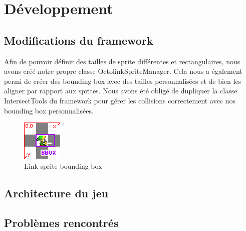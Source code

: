 \chapter{Développement}

\section{Modifications du framework}

Afin de pouvoir définir des tailles de sprite différentes et rectangulaires, nous avons créé notre propre classe OctolinkSpriteManager. Cela nous a également permi de créer des bounding box avec des tailles personnalisées et de bien les aligner par rapport aux sprites. Nous avons été obligé de dupliquer la classe IntersectTools du framework pour gérer les collisions correctement avec nos bounding box personnalisées.

\begin{figure}[ht!]
  \center
  \includegraphics{resources/bbox.png}
  \caption{Link sprite bounding box}
  \label{fig:Link sprite bounding box}
\end{figure}


\section{Architecture du jeu}


\section{Problèmes rencontrés}
